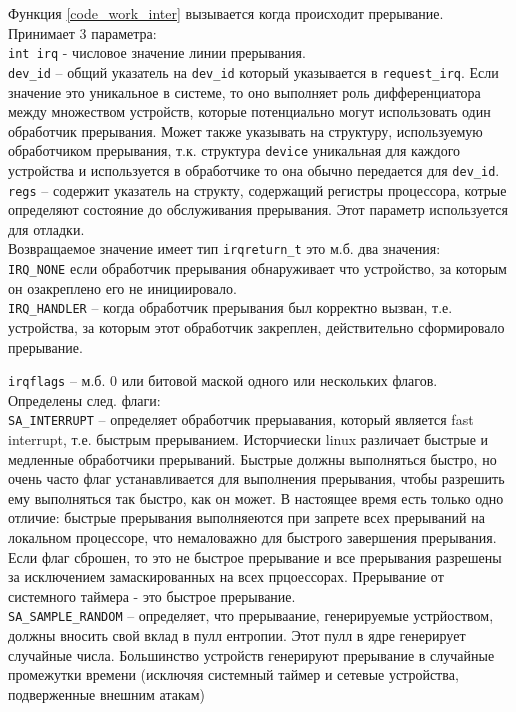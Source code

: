 Функция \ref{code_work_inter} вызывается когда происходит прерывание. Принимает 3 параметра:\\
\verb|int irq| - числовое значение линии прерывания.\\
\verb|dev_id| – общий указатель на \verb|dev_id| который указывается в \verb|request_irq|.  Если значение это уникальное в системе, то оно выполняет роль дифференциатора между множеством устройств, которые потенциально могут использовать один обработчик прерывания. Может также указывать на структуру, используемую обработчиком прерывания, т.к. структура \verb|device| уникальная для каждого устройства и используется в обработчике то она обычно передается для \verb|dev_id|.\\
\verb|regs| – содержит указатель на структу, содержащий регистры процессора, котрые определяют состояние до обслуживания прерывания. Этот параметр используется для отладки.\\

Возвращаемое значение имеет тип  \verb|irqreturn_t| это м.б. два значения:\\
\verb|IRQ_NONE| если обработчик прерывания обнаруживает что устройство, за которым он озакреплено его не инициировало. \\
\verb|IRQ_HANDLER| – когда обработчик прерывания был корректно вызван, т.е. устройства, за которым этот обработчик закреплен, действительно сформировало прерывание. 

\verb|irqflags| – м.б. 0 или битовой маской одного или нескольких флагов. Определены след. флаги:\\
\verb|SA_INTERRUPT| – определяет обработчик прерыавания, который является fast interrupt, т.е. быстрым прерыванием. Исторчиески linux различает быстрые и медленные обработчики прерываний. Быстрые должны выполняться быстро, но очень часто флаг устанавливается для выполнения прерывания, чтобы разрешить ему выполняться так быстро, как он может. В настоящее время есть только одно отличие: быстрые прерывания выполняеются при запрете всех прерываний на локальном процессоре, что немаловажно для быстрого завершения прерывания. Если флаг сброшен, то это не быстрое прерывание и все прерывания разрешены за исключением замаскированных на всех прцоессорах. Прерывание от системного таймера - это быстрое прерывание.\\
\verb|SA_SAMPLE_RANDOM| – определяет, что прерываание, генерируемые устрйоством, должны вносить свой вклад в пулл ентропии. Этот пулл в ядре генерирует случайные числа. Большинство устройств генерируют прерывание в случайные промежутки времени (исключяя системный таймер и сетевые устройства, подверженные внешним атакам)  